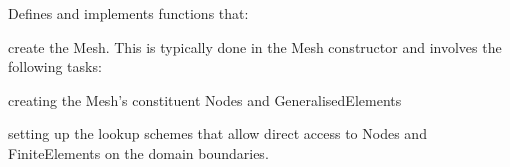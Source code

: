 \begin{center}
\begin{TabularC}{1}
\begin{center}
\begin{TabularC}{1}
\begin{DoxyItemize}
\item Defines and implements functions that\-:
\begin{DoxyItemize}
\item create the Mesh. This is typically done in the Mesh constructor and involves the following tasks\-:
\begin{DoxyItemize}
\item creating the {\ttfamily Mesh's} constituent {\ttfamily Nodes} and {\ttfamily Generalised\-Elements} 
\item setting up the lookup schemes that allow direct access to {\ttfamily Nodes} and {\ttfamily Finite\-Elements} on the domain boundaries.   
\end{DoxyItemize}
\end{DoxyItemize}
\end{DoxyItemize}\\
\end{TabularC}
\end{center}    \\
\end{TabularC}
\end{center} 

